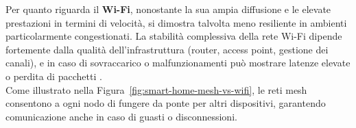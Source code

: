 Per quanto riguarda il \textbf{Wi-Fi}, nonostante la sua ampia diffusione e le elevate prestazioni in termini di velocità, si dimostra talvolta meno resiliente in ambienti particolarmente congestionati. La stabilità complessiva della rete Wi-Fi dipende fortemente dalla qualità dell'infrastruttura (router, access point, gestione dei canali), e in caso di sovraccarico o malfunzionamenti può mostrare latenze elevate o perdita di pacchetti \cite{wifi6-spec}.\\

Come illustrato nella Figura~\ref{fig:smart-home-mesh-vs-wifi}, le reti mesh consentono a ogni nodo di fungere da ponte per altri dispositivi, garantendo comunicazione anche in caso di guasti o disconnessioni.

